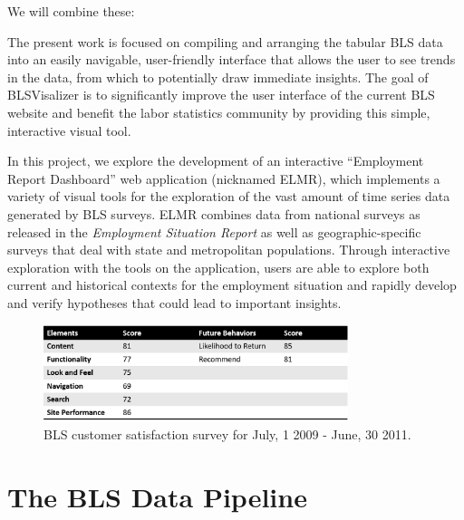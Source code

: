 \documentclass{sigchi}
\newcommand\Peter[1]{{\color{red}#1}}	%
\newcommand\Ben[1]{{\color{blue}#1}}	%
\begin{document}
We will combine these:

\Peter{The present work is focused on compiling and arranging the tabular BLS data into an easily navigable, user-friendly interface that allows the user to see trends in the data, from which to potentially draw immediate insights. The goal of BLSVisalizer is to significantly improve the user interface of the current BLS website and benefit the labor statistics community by providing this simple, interactive visual tool.}

 \Ben{In this project, we explore the development of an interactive ``Employment Report Dashboard'' web application (nicknamed ELMR), which implements a variety of visual tools for the exploration of the vast amount of time series data generated by BLS surveys. ELMR combines data from national surveys as released in the \textit{Employment Situation Report} as well as geographic-specific surveys that deal with state and metropolitan populations. Through interactive exploration with the tools on the application, users are able to explore both current and historical contexts for the employment situation and rapidly develop and verify hypotheses that could lead to important insights.}

\begin{figure}[t]
    \includegraphics[width = 3.5in]{figures/BLSSurvey_ppt.png}
    \caption{BLS customer satisfaction survey for July, 1 2009 - June, 30 2011.}
    \label{CustSat}
\end{figure}

\section{The BLS Data Pipeline}
\end{document}
